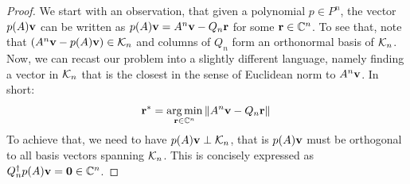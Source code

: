 \begin{proof}
	We start with an observation, that given a polynomial \(p\in P^n\), the vector \(p(A)\vectorbold{v}\)
	can be written as \(p(A)\vectorbold{v} = A^n \vectorbold{v} - Q_n \vectorbold{r}\) for some \(\vectorbold{r}\in \CC^n\).
	To see that, note that \(\left(A^n \vectorbold{v} - p(A)\vectorbold{v}\right) \in \K{n}\) and columns of \(Q_n\) form an
	orthonormal basis of \(\mathcal{K}_{n}\). Now, we can recast our problem into a slightly different language, namely finding a vector
	in \(\mathcal{K}_{n}\) that is the closest in the sense of Euclidean norm to \(A^n \vectorbold{v}\). In short:
	\begin{equation*}
		\vectorbold{r}^{\ast} = \operatorname*{arg\,min}_{\vectorbold{r}\in\CC^n}\norm*{A^n \vectorbold{v} - Q_n \vectorbold{r}}
	\end{equation*}
	To achieve that, we need to have \(p(A)\vectorbold{v}\perp \K{n}\), that is \(p(A)\vectorbold{v}\) must
	be orthogonal to all basis vectors spanning \(\mathcal{K}_{n}\). This is concisely expressed as
	\(Q^{\dagger}_{n} p(A)\vectorbold{v} = \vectorbold{0}\in \CC^n\).


\end{proof}
